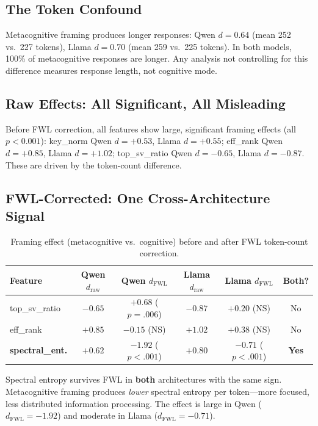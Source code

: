 \documentclass[11pt,a4paper]{article}
\begin{document}
\subsection{The Token Confound}

Metacognitive framing produces longer responses: Qwen $d = 0.64$ (mean 252
vs.\ 227 tokens), Llama $d = 0.70$ (mean 259 vs.\ 225 tokens). In both
models, 100\% of metacognitive responses are longer. Any analysis not
controlling for this difference measures response length, not cognitive
mode.

\subsection{Raw Effects: All Significant, All Misleading}

Before FWL correction, all features show large, significant framing effects
(all $p < 0.001$): key\_norm Qwen $d = +0.53$, Llama $d = +0.55$;
eff\_rank Qwen $d = +0.85$, Llama $d = +1.02$; top\_sv\_ratio Qwen
$d = -0.65$, Llama $d = -0.87$. These are driven by the token-count
difference.

\subsection{FWL-Corrected: One Cross-Architecture Signal}

\begin{table}[H]
\centering
\caption{Framing effect (metacognitive vs.\ cognitive) before and after FWL token-count correction.}
\label{tab:study2_fwl}
\begin{tabular}{lccccc}
\toprule
\textbf{Feature} & \textbf{Qwen $d_{\text{raw}}$} & \textbf{Qwen $d_{\text{FWL}}$} & \textbf{Llama $d_{\text{raw}}$} & \textbf{Llama $d_{\text{FWL}}$} & \textbf{Both?} \\
\midrule
top\_sv\_ratio     & $-0.65$ & $+0.68$ ($p = .006$)  & $-0.87$ & $+0.20$ (NS)  & No  \\
eff\_rank          & $+0.85$ & $-0.15$ (NS)           & $+1.02$ & $+0.38$ (NS)  & No  \\
\textbf{spectral\_ent.} & $+0.62$ & $\mathbf{-1.92}$ ($p < .001$) & $+0.80$ & $\mathbf{-0.71}$ ($p < .001$) & \textbf{Yes} \\
\bottomrule
\end{tabular}
\end{table}

Spectral entropy survives FWL in \textbf{both} architectures with the same
sign. Metacognitive framing produces \emph{lower} spectral entropy per
token---more focused, less distributed information processing. The effect is
large in Qwen ($d_{\text{FWL}} = -1.92$) and moderate in Llama
($d_{\text{FWL}} = -0.71$).
\end{document}
